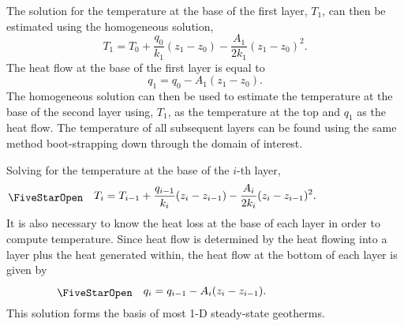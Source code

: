 The solution for the temperature at the base of the first layer, $T_1$, can then be estimated using the homogeneous solution,
\[
    T_1 = T_0 + \frac{q_0}{k_1} (z_1 - z_0) - \frac{A_1}{2 k_1} (z_1 - z_0)^2.
\]
The heat flow at the base of the first layer is equal to
\[
    q_1 = q_0 - A_1 (z_1 - z_0).
\]
The homogeneous solution can then be used to estimate the temperature at the base of the second layer using, $T_1$, as the temperature at the top and $q_1$ as the heat flow.  The temperature of all subsequent layers can be found using the same method boot-strapping down through the domain of interest.  

Solving for the temperature at the base of the $i$-th layer,
\begin{equation}
    \workeq
    T_{i} = T_{i-1} + \frac{q_{i-1}}{k_i} (z_i - z_{i-1})
    - \frac{A_i}{2 k_i} (z_i - z_{i-1})^2.
\end{equation}
It is also necessary to know the heat loss at the base of each layer in order to compute temperature.  Since heat flow is determined by the heat flowing into a layer plus the heat generated within, the heat flow at the bottom of each layer is given by
\begin{equation}
    \workeq
    q_i = q_{i-1} - A_i (z_i - z_{i-1}).
\end{equation}
This solution forms the basis of most 1-D steady-state geotherms.

